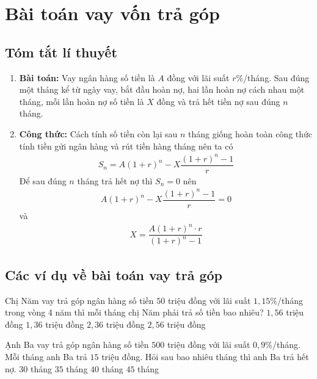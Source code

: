 \section{Bài toán vay vốn trả góp}
\subsection{Tóm tắt lí thuyết}
\begin{enumerate}[1)]
	\item \textbf{Bài toán:} Vay ngân hàng số tiền là $A$ đồng với lãi suất $r\%$/tháng. Sau đúng một tháng kể từ ngày vay, bắt đầu hoàn nợ, hai lần hoàn nợ cách nhau một tháng, mỗi lần hoàn nợ số tiền là $X$ đồng và trả hết tiền nợ sau đúng $n$ tháng.
	\item \textbf{Công thức:} Cách tính số tiền còn lại sau $n$ tháng giống hoàn toàn công thức tính tiền gửi ngân hàng và rút tiền hàng tháng nên ta có
	\begin{eqnarray}
	\boxed{S_n=A(1+r)^n-X\dfrac{(1+r)^n-1}{r}}
	\end{eqnarray}
	Để sau đúng $n$ tháng trả hết nợ thì $S_n=0$ nên
	\begin{eqnarray}
	\boxed{A(1+r)^n-X\dfrac{(1+r)^n-1}{r}=0}
	\end{eqnarray}
	và 
	\begin{eqnarray}
	\boxed{X=\dfrac{A(1+r)^n\cdot r}{(1+r)^n-1}}
	\end{eqnarray}
\end{enumerate}
\subsection{Các ví dụ về bài toán vay trả góp}
\begin{vd}%
	Chị Năm vay trả góp ngân hàng số tiền $50$ triệu đồng với lãi suất $1,15\%$/tháng trong vòng 4 năm thì mỗi tháng chị Năm phải trả số tiền bao nhiêu?\newline
	\choice
	{$1,56$ triệu đồng}
	{\True $1,36$ triệu đồng}
	{$2,36$ triệu đồng}
	{$2,56$ triệu đồng}
\end{vd}

\begin{vd}%
	Ạnh Ba vay trả góp ngân hàng số tiền $500$ triệu đồng với lãi suất $0,9\%$/tháng. Mỗi tháng anh Ba trả $15$ triệu đồng. Hỏi sau bao nhiêu tháng thì anh Ba trả hết nợ.\newline
	\choice
	{$30$ tháng}
	{$35$ tháng}
	{\True $40$ tháng}
	{$45$ tháng}
\end{vd}

